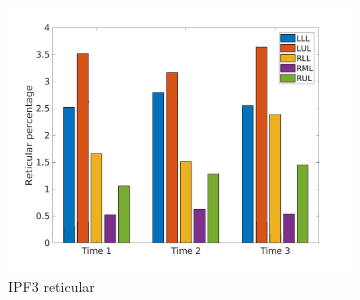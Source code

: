 \begin{figure}[H]
\begin{subfigure}{.46\linewidth}%
  \includegraphics[width=\linewidth,trim={{.0\wd0} {.0\wd0} {.0\wd0} {.0\wd0}},clip]{Appendix/Image_AppexA/LobarDistribution/IPF3ReticularLobarRegionDiseaseDistributionOverTime.jpg}
  \caption{IPF3 reticular}
  \label{fig:IPF3LobarRegionDiseaseDistributionOverTime-b}
\end{subfigure}
\begin{subfigure}{.46\linewidth}%

\end{subfigure}
\end{figure}
